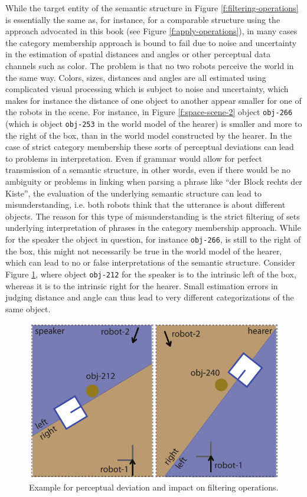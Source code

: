 While the target entity of the semantic structure in Figure \ref{f:filtering-operations} 
is essentially the same as, for instance, for a comparable structure using the 
approach advocated in this book (see Figure \ref{f:apply-operations}),
in many cases the category membership 
approach is bound to fail due to noise and uncertainty in the 
estimation of spatial distances and angles or other perceptual
data channels such as color. The problem is that no two robots perceive
the world in the same way. Colors, sizes, distances and 
angles are all estimated using
complicated visual processing which is subject to noise and uncertainty, which
makes for instance the distance of one object to another appear smaller
for one of the robots in the scene. For instance, in Figure \ref{f:space-scene-2}
object {\footnotesize\tt obj-266} (which is object {\footnotesize\tt obj-253} in the world model 
of the hearer) is smaller and more to the right of the box, than in the world model
constructed by the hearer. In the case of strict category membership these
sorts of perceptual deviations can lead to problems in interpretation.
Even if grammar would allow for perfect transmission of a semantic structure,
in other words, even if there would be no ambiguity or problems
in linking when parsing a phrase like ``der Block rechts der Kiste'', the
evaluation of the underlying semantic structure can lead to misunderstanding, 
i.e. both robots think that the utterance is about different objects. 
The reason for this type of misunderstanding is the strict filtering of sets
underlying interpretation of phrases in the category membership
approach. While for the speaker the object in question, for instance 
{\footnotesize\tt obj-266}, is still to the right of the box, this might not necessarily 
be true in the world model of the hearer, which can lead to no or false 
interpretations of the semantic structure. Consider Figure 
\ref{f:perceptual-deviation}, where object {\footnotesize\tt obj-212}
for the speaker is to the intrinsic left of the box, whereas it is to the
intrinsic right for the hearer. Small estimation errors in judging
distance and angle can thus lead to very different categorizations of 
the same object.

\begin{figure}
\begin{center}
\includegraphics[width=0.6\columnwidth]{figs/perceptual-deviation}
\end{center}
\caption[Perceptual deviation]{Example for perceptual deviation and
impact on filtering operations.}
\label{f:perceptual-deviation}
\end{figure}

